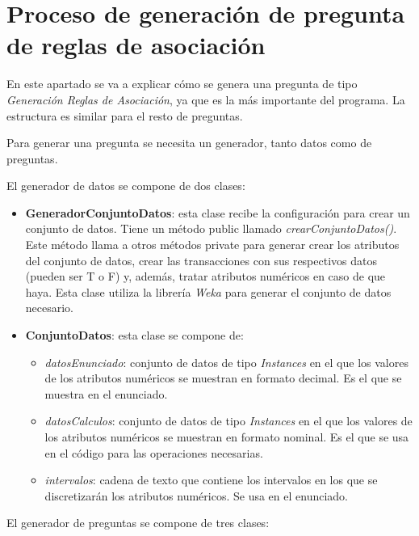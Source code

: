 \section{Proceso de generación de pregunta de reglas de asociación}

En este apartado se va a explicar cómo se genera una pregunta de tipo \textit{Generación Reglas de Asociación}, ya que es la más importante del programa. La estructura es similar para el resto de preguntas.

Para generar una pregunta se necesita un generador, tanto datos como de preguntas. 

El generador de datos se compone de dos clases:

\begin{itemize}
    \item \textbf{GeneradorConjuntoDatos}: esta clase recibe la configuración para crear un conjunto de datos. Tiene un método public llamado \textit{crearConjuntoDatos()}. Este método llama a otros métodos private para generar crear los atributos del conjunto de datos, crear las transacciones con sus respectivos datos (pueden ser T o F) y, además, tratar atributos numéricos en caso de que haya. Esta clase utiliza la librería \textit{Weka} para generar el conjunto de datos necesario. 
    \item \textbf{ConjuntoDatos}: esta clase se compone de:
    \begin{itemize}
        \item \textit{datosEnunciado}: conjunto de datos de tipo \textit{Instances} en el que los valores de los atributos numéricos se muestran en formato decimal. Es el que se muestra en el enunciado.
        \item \textit{datosCalculos}: conjunto de datos de tipo \textit{Instances} en el que los valores de los atributos numéricos se muestran en formato nominal. Es el que se usa en el código para las operaciones necesarias.
        \item \textit{intervalos}: cadena de texto que contiene los intervalos en los que se discretizarán los atributos numéricos. Se usa en el enunciado.
    \end{itemize}
\end{itemize}

El generador de preguntas se compone de tres clases:

